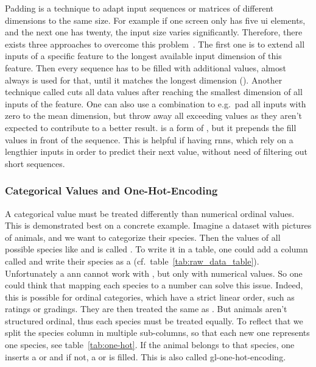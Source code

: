 Padding is a technique to adapt input sequences or matrices of different dimensions to the same size.
For example if one screen only has five \gls{ui} elements, and the next one has twenty, the input size varies significantly.
Therefore, there exists three approaches to overcome this problem~\cite{baeldung_padding}.
The first one is to extend all inputs of a specific feature to the longest available input dimension of this feature.
Then every sequence has to be filled with additional values, almost always  is used for that, until it matches the longest dimension ().
Another technique called  cuts all data values after reaching the smallest dimension of all inputs of the feature.
One can also use a combination to e.g.\ pad all inputs with zero to the mean dimension, but throw away all exceeding values as they aren't expected to contribute to a better result.
 is a form of , but it prepends the fill values in front of the sequence.
This is helpful if having \gls{rnn}s, which rely on a lengthier inputs in order to predict their next value, without need of filtering out short sequences.

\subsubsection{Categorical Values and One-Hot-Encoding}
\label{subsubsec:categorical_variables}


A categorical value must be treated differently than numerical ordinal values.
This is demonstrated best on a concrete example.
Imagine a dataset with pictures of animals, and we want to categorize their species.
Then the values of all possible species like  and  is called .
To write it in a table, one could add a column called  and write their species as a  (cf.\ table~\ref{tab:raw_data_table}).
Unfortunately a \gls{ann} cannot work with , but only with numerical values.
So one could think that mapping each species to a number can solve this issue.
Indeed, this is possible for ordinal categories, which have a strict linear order, such as ratings or gradings.
They are then treated the same as .
But animals aren't structured ordinal, thus each species must be treated equally.
To reflect that we split the species column in multiple sub-columns, so that each new one represents one species, see table~\ref{tab:one-hot}.
If the animal belongs to that species, one inserts a  or  and if not, a  or  is filled.
This is also called \gls{gl-one-hot}-encoding.

